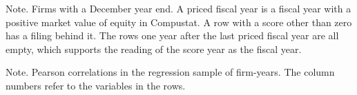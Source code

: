 \documentclass[12pt,a4paper]{article}
\newcommand{\tablenote}[1]{\par\smallskip\begin{minipage}{\linewidth}\footnotesize\setstretch{1.05}#1\end{minipage}}
\newcommand{\widetable}[1]{\resizebox{\ifdim\width>\linewidth\linewidth\else\width\fi}{!}{}}
\begin{document}
\begin{table}[!htbp]
\centering\small
\caption{Test of the meaning of the score year}\label{tab:alignment}
\widetable{tables/tab_alignment}
\tablenote{Note. Firms with a December year end. A priced fiscal year is a fiscal year with a positive market value of equity in Compustat. A row with a score other than zero has a filing behind it. The rows one year after the last priced fiscal year are all empty, which supports the reading of the score year as the fiscal year.}
\end{table}

\begin{table}[!htbp]
\centering\footnotesize
\caption{Correlations}\label{tab:correlations}
\widetable{tables/tab_correlations}
\tablenote{Note. Pearson correlations in the regression sample of \nFinal{} firm-years. The column numbers refer to the variables in the rows.}
\end{table}
\end{document}
